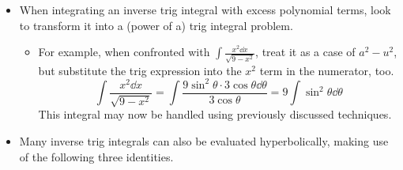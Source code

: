 \documentclass[../main.tex]{subfiles}
\begin{document}
\begin{itemize}
\begin{itemize}
\begin{itemize}
\begin{align*}
                &= \ln\left| \frac{a\left( u+\sqrt{u^2-a^2} \right)}{\left( u-\sqrt{u^2-a^2} \right)\left( u+\sqrt{u^2-a^2} \right)} \right|\\
                &= \ln\left| \frac{a\left( u+\sqrt{u^2-a^2} \right)}{a^2} \right|\\
                &= \ln\left| \frac{u}{a}+\frac{\sqrt{u^2-a^2}}{a} \right|
            \end{align*}
            Thus, we have $\ln\left| \frac{u}{a}+\frac{\sqrt{u^2-a^2}}{a} \right|+C$ as the one solution\footnote{Note that we could choose to use the other solution, but we choose this one because it's "simpler" (it uses addition instead of subtraction).}.
        \end{itemize}
        \item Some integrals will have extraneous constants that can be combined with $C$ to simplify the \emph{indefinite} integral.
        \begin{itemize}
            \item Continuing with the above example,
            \begin{align*}
                \int\frac{\dd u}{\sqrt{u^2-a^2}} &= \ln\left| \frac{u}{a}+\frac{\sqrt{u^2-a^2}}{a} \right|+C\\
                &= \ln\left| u+\sqrt{u^2-a^2} \right|-\ln|a|+C\\
                &= \ln\left| u+\sqrt{u^2-a^2} \right|+C
            \end{align*}
        \end{itemize}
    \end{itemize}
    \item When integrating an inverse trig integral with excess polynomial terms, look to transform it into a (power of a) trig integral problem.
    \begin{itemize}
        \item For example, when confronted with $\int\frac{x^2\dd{x}}{\sqrt{9-x^2}}$, treat it as a case of $a^2-u^2$, but substitute the trig expression into the $x^2$ term in the numerator, too.
        \begin{equation*}
            \int\frac{x^2\dd{x}}{\sqrt{9-x^2}} = \int\frac{9\sin^2\theta\cdot 3\cos\theta\dd{\theta}}{3\cos\theta}
            = 9\int\sin^2\theta\dd{\theta}
        \end{equation*}
        This integral may now be handled using previously discussed techniques.
    \end{itemize}
    \item Many inverse trig integrals can also be evaluated hyperbolically, making use of the following three identities.

\end{itemize}
\end{document}
